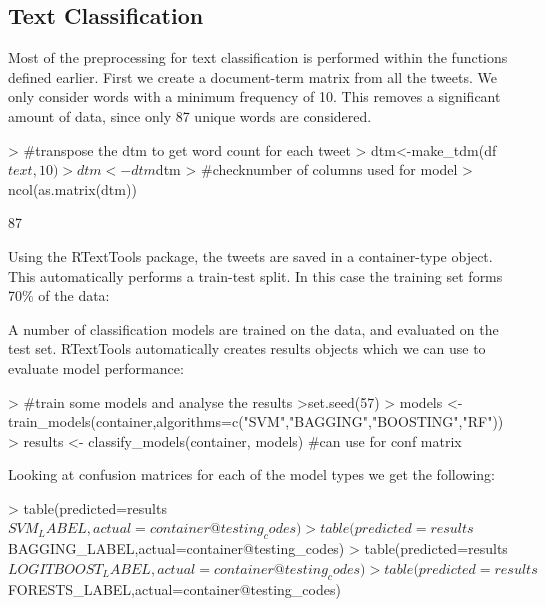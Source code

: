\documentclass[10pt]{article}
\begin{document}
\subsection{Text Classification}
Most of the preprocessing for text classification is performed within the functions defined earlier. First we create a document-term matrix from all the tweets. We only consider words with a minimum frequency of 10. This removes a significant amount of data, since only 87 unique words are considered.
\hspace{1cm} 
\begin{Schunk}
\begin{Sinput}

> #transpose the dtm to get word count for each tweet
> dtm<-make_tdm(df$text,10)
> dtm<-dtm$dtm
> #checknumber of columns used for model
> ncol(as.matrix(dtm))
\end{Sinput}
\begin{Soutput}
[1] 87
\end{Soutput}
\end{Schunk}
\hspace{1cm} 
Using the RTextTools package, the tweets are saved in a container-type object. This automatically performs a train-test split. In this case the training set forms 70\% of the data:
\hspace{1cm} 
\begin{Schunk}
\end{Schunk}
\hspace{1cm} 
A number of classification models are trained on the data, and evaluated on the test set. RTextTools automatically creates results objects which we can use to evaluate model performance:
\hspace{1cm} 
\begin{Schunk}
\begin{Sinput}
> #train some models and analyse the results
>set.seed(57)
> models <- train_models(container,algorithms=c("SVM","BAGGING","BOOSTING","RF"))
> results <- classify_models(container, models) #can use for conf matrix

\end{Sinput}
\end{Schunk}
\hspace{1cm} 
Looking at confusion matrices for each of the model types we get the following:
\hspace{1cm} 
\begin{Schunk}
\begin{Sinput}

> table(predicted=results$SVM_LABEL,actual=container@testing_codes)
> table(predicted=results$BAGGING_LABEL,actual=container@testing_codes)
> table(predicted=results$LOGITBOOST_LABEL,actual=container@testing_codes)
> table(predicted=results$FORESTS_LABEL,actual=container@testing_codes)
\end{Sinput}
\end{Schunk}
\end{document}
